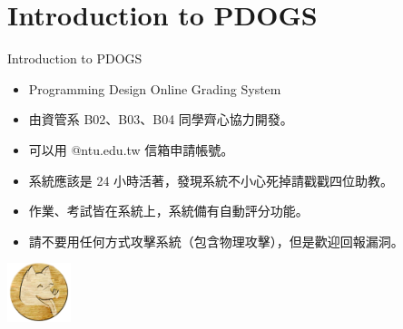 \documentclass[t]{beamer}
\begin{document}
\section{Introduction to PDOGS}
\begin{frame}{Introduction to PDOGS}
  \begin{itemize}
    \item Programming Design Online Grading System
    \item 由資管系 B02、B03、B04 同學齊心協力開發。
    \item 可以用 @ntu.edu.tw 信箱申請帳號。
    \item 系統應該是 24 小時活著，發現系統不小心死掉請戳戳四位助教。
    \item 作業、考試皆在系統上，系統備有自動評分功能。
    \item 請不要用任何方式攻擊系統（包含物理攻擊），但是歡迎回報漏洞。
  \end{itemize}
  \begin{center}
    \includegraphics[width=5em]{image/pdogs.png}
  \end{center}
\end{frame}

\end{document}
